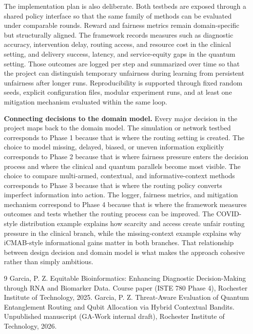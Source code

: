 \documentclass{IEEEtran}
\begin{document}
The implementation plan is also deliberate. Both testbeds are exposed through a shared policy interface so that the same family of methods can be evaluated under comparable rounds. Reward and fairness metrics remain domain-specific but structurally aligned. The framework records measures such as diagnostic accuracy, intervention delay, routing access, and resource cost in the clinical setting, and delivery success, latency, and service-equity gaps in the quantum setting. Those outcomes are logged per step and summarized over time so that the project can distinguish temporary unfairness during learning from persistent unfairness after longer runs. Reproducibility is supported through fixed random seeds, explicit configuration files, modular experiment runs, and at least one mitigation mechanism evaluated within the same loop.

\noindent\textbf{Connecting decisions to the domain model.} Every major decision in the project maps back to the domain model. The simulation or network testbed corresponds to Phase 1 because that is where the routing setting is created. The choice to model missing, delayed, biased, or uneven information explicitly corresponds to Phase 2 because that is where fairness pressure enters the decision process and where the clinical and quantum parallels become most visible. The choice to compare multi-armed, contextual, and informative-context methods corresponds to Phase 3 because that is where the routing policy converts imperfect information into action. The logger, fairness metrics, and mitigation mechanism correspond to Phase 4 because that is where the framework measures outcomes and tests whether the routing process can be improved. The COVID-style distribution example explains how scarcity and access create unfair routing pressure in the clinical branch, while the missing-context example explains why iCMAB-style informational gains matter in both branches. That relationship between design decision and domain model is what makes the approach cohesive rather than simply ambitious.

\vspace{-0.25em}
{\footnotesize\begin{thebibliography}{9}\setlength{\itemsep}{0em}
Garcia, P. Z. Equitable Bioinformatics: Enhancing Diagnostic Decision-Making through {RNA}
and Biomarker Data. Course paper (ISTE 780 Phase 4), Rochester Institute of Technology,
2025.
Garcia, P. Z. Threat-Aware Evaluation of Quantum Entanglement Routing and Qubit Allocation
via Hybrid Contextual Bandits. Unpublished manuscript (GA-Work internal draft), Rochester
Institute of Technology, 2026.
\end{thebibliography}}
\end{document}
